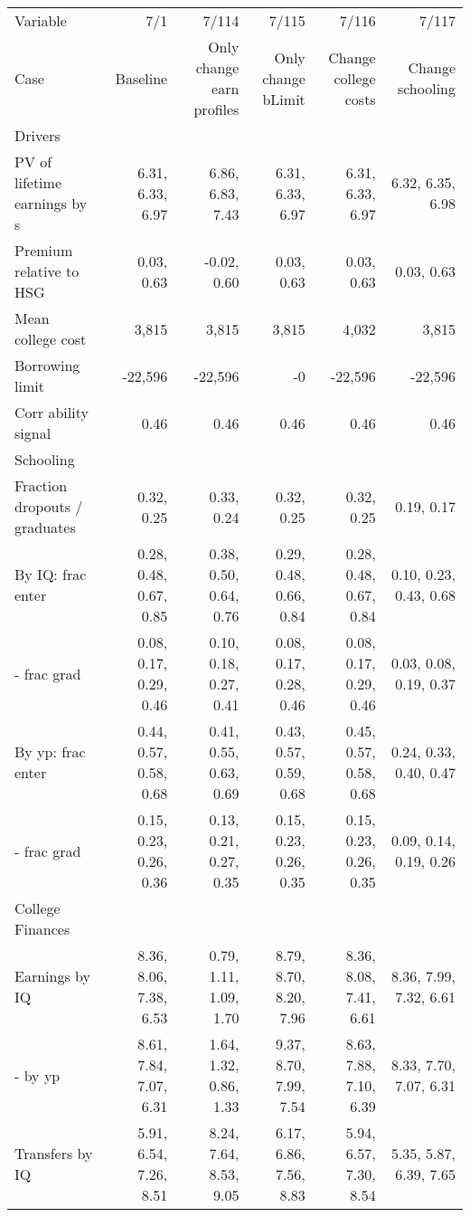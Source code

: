 \begin{tabular}{lrrrrr}
\hline
Variable & 7/1  & 7/114  & 7/115  & 7/116  & 7/117  \\
Case & Baseline  & Only change earn profiles  & Only change bLimit  & Change college costs  & Change schooling  \\
Drivers &   &   &   &   &   \\
PV of lifetime earnings by s & 6.31, 6.33, 6.97  & 6.86, 6.83, 7.43  & 6.31, 6.33, 6.97  & 6.31, 6.33, 6.97  & 6.32, 6.35, 6.98  \\
Premium relative to HSG & 0.03, 0.63  & -0.02, 0.60  & 0.03, 0.63  & 0.03, 0.63  & 0.03, 0.63  \\
Mean college cost & 3,815  & 3,815  & 3,815  & 4,032  & 3,815  \\
Borrowing limit & -22,596  & -22,596  & -0  & -22,596  & -22,596  \\
Corr ability signal & 0.46  & 0.46  & 0.46  & 0.46  & 0.46  \\
\hline
Schooling &   &   &   &   &   \\
Fraction dropouts / graduates & 0.32, 0.25  & 0.33, 0.24  & 0.32, 0.25  & 0.32, 0.25  & 0.19, 0.17  \\
By IQ: frac enter & 0.28, 0.48, 0.67, 0.85  & 0.38, 0.50, 0.64, 0.76  & 0.29, 0.48, 0.66, 0.84  & 0.28, 0.48, 0.67, 0.84  & 0.10, 0.23, 0.43, 0.68  \\
- frac grad & 0.08, 0.17, 0.29, 0.46  & 0.10, 0.18, 0.27, 0.41  & 0.08, 0.17, 0.28, 0.46  & 0.08, 0.17, 0.29, 0.46  & 0.03, 0.08, 0.19, 0.37  \\
By yp: frac enter & 0.44, 0.57, 0.58, 0.68  & 0.41, 0.55, 0.63, 0.69  & 0.43, 0.57, 0.59, 0.68  & 0.45, 0.57, 0.58, 0.68  & 0.24, 0.33, 0.40, 0.47  \\
- frac grad & 0.15, 0.23, 0.26, 0.36  & 0.13, 0.21, 0.27, 0.35  & 0.15, 0.23, 0.26, 0.35  & 0.15, 0.23, 0.26, 0.35  & 0.09, 0.14, 0.19, 0.26  \\
\hline
College Finances &   &   &   &   &   \\
Earnings by IQ & 8.36, 8.06, 7.38, 6.53  & 0.79, 1.11, 1.09, 1.70  & 8.79, 8.70, 8.20, 7.96  & 8.36, 8.08, 7.41, 6.61  & 8.36, 7.99, 7.32, 6.61  \\
- by yp & 8.61, 7.84, 7.07, 6.31  & 1.64, 1.32, 0.86, 1.33  & 9.37, 8.70, 7.99, 7.54  & 8.63, 7.88, 7.10, 6.39  & 8.33, 7.70, 7.07, 6.31  \\
Transfers by IQ & 5.91, 6.54, 7.26, 8.51  & 8.24, 7.64, 8.53, 9.05  & 6.17, 6.86, 7.56, 8.83  & 5.94, 6.57, 7.30, 8.54  & 5.35, 5.87, 6.39, 7.65  \\

\end{tabular}
